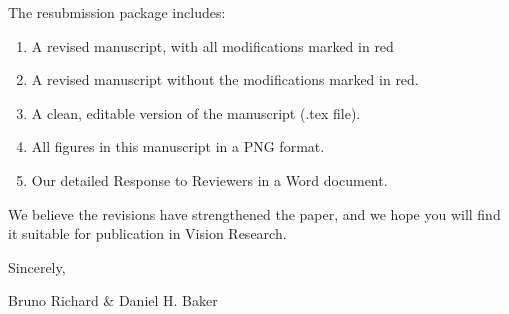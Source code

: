 \documentclass[12pt]{article}
\begin{document}
The resubmission package includes:
\begin{enumerate}[itemsep = -1pt, topsep=-1pt]
	\item A revised manuscript, with all modifications marked in red 
	\item A revised manuscript without the modifications marked in red. 
	\item A clean, editable version of the manuscript (.tex file).
	\item All figures in this manuscript in a PNG format.
	\item Our detailed Response to Reviewers in a Word document.
\end{enumerate}

We believe the revisions have strengthened the paper, and we hope you will find it suitable for publication in Vision Research. 

Sincerely,

Bruno Richard \& Daniel H. Baker
\end{document}
